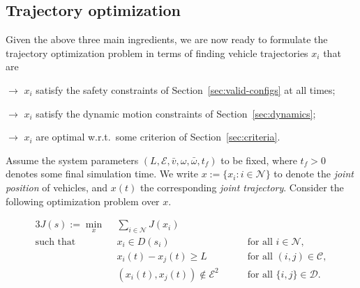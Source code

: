\documentclass{report}
\theoremstyle{definition}
\theoremstyle{plain}
\begin{document}
\subsection{Trajectory optimization}\label{sec:motion-planning}

Given the above three main ingredients, we are now ready to formulate the
trajectory optimization problem in terms of finding vehicle trajectories $x_i$
that are
\begin{samepage}
\begin{description}[leftmargin=\parindent,labelindent=\parindent,labelwidth=\widthof{\bfseries collision-free }]
  \item[safe] $\rightarrow$ $x_i$ satisfy the safety constraints of
        Section~\ref{sec:valid-configs} at all times;
  \item[admissible] $\rightarrow$ $x_i$ satisfy the dynamic motion constraints of
        Section~\ref{sec:dynamics};
  \item[efficient] $\rightarrow$ $x_i$ are optimal w.r.t.\ some criterion of
        Section~\ref{sec:criteria}.
\end{description}
\end{samepage}
%
Assume the system parameters
$(L,\mathcal{E}, \bar{v}, \omega, \bar{\omega}, t_{f})$ to be fixed, where
$t_f > 0$ denotes some final simulation time.
%
We write $x := \{ x_{i} : i \in \mathcal{N} \}$ to denote the \emph{joint position}
of vehicles, and $x(t)$ the corresponding \emph{joint trajectory}. Consider the
following optimization problem over $x$.

\begin{mdframed}
\vspace{-\abovedisplayskip}
\begin{alignat}{3}\label{eq:T}
  J(s) := \min_{x} \;\, & \sum_{i \in \mathcal{N}} J(x_{i}) \tag{T} \\
  \text{such that } \; & x_{i} \in D(s_{i}) && \quad \text{ for all } i \in \mathcal{N} , \tag{T.1} \label{eq:T1} \\
           & x_{i}(t) - x_{j}(t) \geq L && \quad \text{ for all } (i,j) \in \mathcal{C} , \tag{T.2} \label{eq:T2}\\
           & (x_{i}(t), x_{j}(t)) \notin \mathcal{E}^{2} && \quad\text{ for all } \{i, j\} \in \mathcal{D} . \tag{T.3} \label{eq:T3}
\end{alignat}
\end{mdframed}
\end{document}
